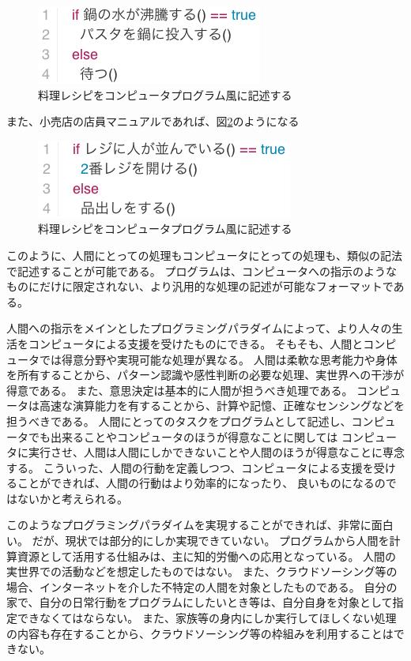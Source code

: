 \begin{figure}[htbp]
  \begin{center}
  \includegraphics[width=.4\linewidth,bb=0 0 281 98]{images/background_cooking.js.png}
  \end{center}
  \caption{料理レシピをコンピュータプログラム風に記述する}
  \label{fig:background_cooking}
\end{figure}

また、小売店の店員マニュアルであれば、図\ref{fig:background_retail}のようになる

\begin{figure}[htbp]
  \begin{center}
  \includegraphics[width=.4\linewidth,bb=0 0 319 98]{images/background_retail.js.png}
  \end{center}
  \caption{料理レシピをコンピュータプログラム風に記述する}
  \label{fig:background_retail}
\end{figure}

このように、人間にとっての処理もコンピュータにとっての処理も、類似の記法で記述することが可能である。
プログラムは、コンピュータへの指示のようなものにだけに限定されない、より汎用的な処理の記述が可能なフォーマットである。

人間への指示をメインとしたプログラミングパラダイムによって、より人々の生活をコンピュータによる支援を受けたものにできる。
そもそも、人間とコンピュータでは得意分野や実現可能な処理が異なる。
人間は柔軟な思考能力や身体を所有することから、パターン認識や感性判断の必要な処理、実世界への干渉が得意である。
また、意思決定は基本的に人間が担うべき処理である。
コンピュータは高速な演算能力を有することから、計算や記憶、正確なセンシングなどを担うべきである。
人間にとってのタスクをプログラムとして記述し、コンピュータでも出来ることやコンピュータのほうが得意なことに関しては
コンピュータに実行させ、人間は人間にしかできないことや人間のほうが得意なことに専念する。
こういった、人間の行動を定義しつつ、コンピュータによる支援を受けることができれば、人間の行動はより効率的になったり、
良いものになるのではないかと考えられる。

このようなプログラミングパラダイムを実現することができれば、非常に面白い。
だが、現状では部分的にしか実現できていない。
プログラムから人間を計算資源として活用する仕組みは、主に知的労働への応用となっている。
人間の実世界での活動などを想定したものではない。
また、クラウドソーシング等の場合、インターネットを介した不特定の人間を対象としたものである。
自分の家で、自分の日常行動をプログラムにしたいとき等は、自分自身を対象として指定できなくてはならない。
また、家族等の身内にしか実行してほしくない処理の内容も存在することから、クラウドソーシング等の枠組みを利用することはできない。

